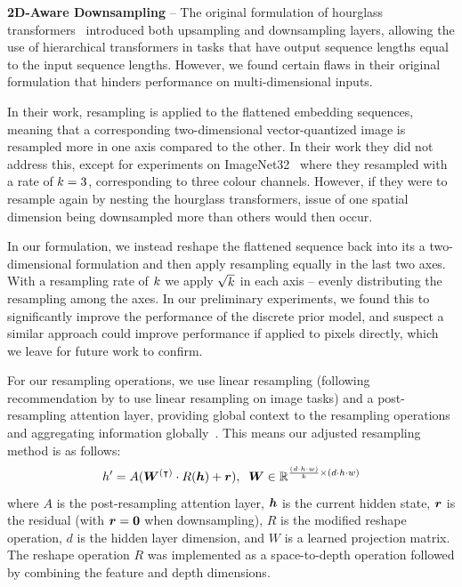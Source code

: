 \textbf{2D-Aware Downsampling} -- The original formulation of hourglass
transformers~\cite{nawrot2021hierarchical} introduced both upsampling and
downsampling layers, allowing the use of hierarchical transformers in tasks that
have output sequence lengths equal to the input sequence lengths. However,
we found certain flaws in their original formulation that hinders performance on
multi-dimensional inputs.

In their work, resampling is applied to the flattened embedding sequences,
meaning that a corresponding two-dimensional vector-quantized image is resampled
more in one axis compared to the other. In their work they did not address this,
except for experiments on ImageNet32~\cite{russakovsky2015imagenet} where they
resampled with a rate of $k=3$, corresponding to three colour
channels. However, if they were to resample again by nesting the hourglass
transformers, issue of one spatial dimension being
downsampled more than others would then occur.

In our formulation, we instead reshape the flattened sequence back into its a
two-dimensional formulation and then apply resampling equally in the last two axes.
With a resampling rate of $k$ we apply $\sqrt{k}$ in
each axis -- evenly distributing the resampling among the axes. In our
preliminary experiments, we found this to significantly improve the performance
of the discrete prior model, and suspect a similar approach could improve
performance if applied to pixels directly, which we leave for future work to
confirm.

For our resampling operations, we use linear resampling (following
recommendation by \cite{nawrot2021hierarchical} to use linear resampling on
image tasks) and a post-resampling attention layer, providing global context to
the resampling operations and aggregating information
globally~\cite{nawrot2021hierarchical}. This means our adjusted resampling
method is as follows:
\begin{equation}
    h' = A({\bm{W}}^{(\intercal)} \cdot R({\bm{h}}) + {\bm{r}}), \;\; {\bm{W}} \in
    \mathbb{R}^{\frac{(d \cdot h \cdot w)}{k} \times (d \cdot h \cdot w)}
\end{equation}
where $A$ is the post-resampling attention layer, ${\bm{h}}$ is the current hidden
state, ${\bm{r}}$ is the residual (with ${\bm{r}} = \bm{0}$ when downsampling), $R$ is the
modified reshape operation, $d$ is the hidden layer dimension, and $W$ is a
learned projection matrix. The reshape operation $R$ was implemented as a
space-to-depth operation followed by combining the feature and depth dimensions.

